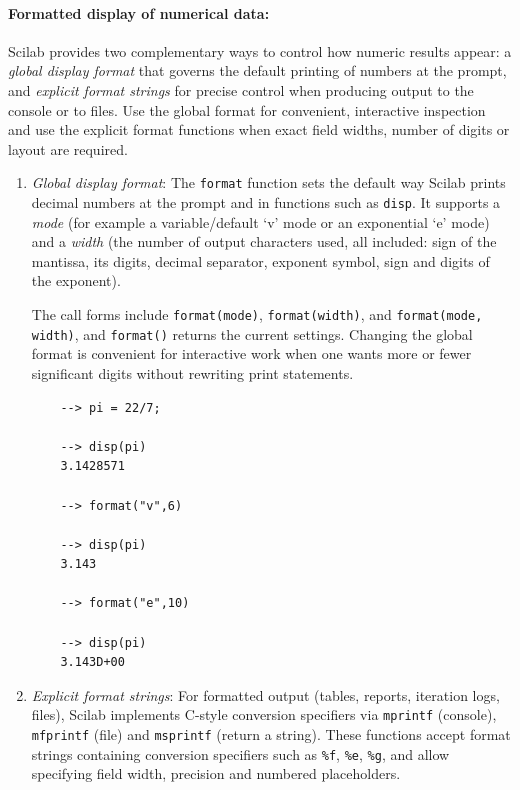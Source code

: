 		\paragraph{Formatted display of numerical data:} Scilab provides two complementary ways to control how numeric results appear: a \textit{global display format} that governs the default printing of numbers at the prompt, and \textit{explicit format strings} for precise control when producing output to the console or to files. Use the global format for convenient, interactive inspection and use the explicit format functions when exact field widths, number of digits or layout are required.
		\begin{enumerate}
			\item \textit{Global display format}: The \texttt{format} function sets the default way Scilab prints decimal numbers at the prompt and in functions such as \texttt{disp}. It supports a \textit{mode} (for example a variable/default `v' mode or an exponential `e' mode) and a \textit{width} (the number of output characters used, all included: sign of the mantissa, its digits, decimal separator, exponent symbol, sign and digits of the exponent).
			
			The call forms include \texttt{format(mode)}, \texttt{format(width)}, and \texttt{format(mode, width)}, and \texttt{format()} returns the current settings. Changing the global format is convenient for interactive work when one wants more or fewer significant digits without rewriting print statements.
			\begin{verbatim}
	--> pi = 22/7;
	
	--> disp(pi)
	3.1428571
	
	--> format("v",6)
	
	--> disp(pi)
	3.143
	
	--> format("e",10)
	
	--> disp(pi)
	3.143D+00
			\end{verbatim}
			
			\item \textit{Explicit format strings}: For formatted output (tables, reports, iteration logs, files), Scilab implements C-style conversion specifiers via \texttt{mprintf} (console), \texttt{mfprintf} (file) and \texttt{msprintf} (return a string). These functions accept format strings containing conversion specifiers such as \texttt{\%f}, \texttt{\%e}, \texttt{\%g}, and allow specifying field width, precision and numbered placeholders.
		\end{enumerate}
		
